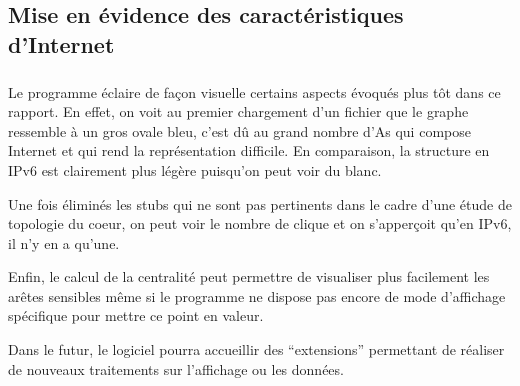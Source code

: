 \subsection{Mise en évidence des caractéristiques d'Internet}
\subparagraph{}
Le programme \'eclaire de fa\c con visuelle certains aspects \'evoqu\'es plus t\^ot dans ce rapport. En effet, on voit au premier chargement d'un fichier que le graphe ressemble \`a un gros ovale bleu, c'est d\^u au grand nombre d'As qui compose Internet et qui rend la repr\'esentation difficile. En comparaison, la structure en IPv6 est clairement plus l\'eg\`ere puisqu'on peut voir du blanc.
\par
Une fois \'elimin\'es les stubs qui ne sont pas pertinents dans le cadre d'une \'etude de topologie du coeur, on peut voir le nombre de clique et on s'apper\c coit qu'en IPv6, il n'y en a qu'une.
\par
Enfin, le calcul de la centralit\'e peut permettre de visualiser plus facilement les ar\^etes sensibles m\^eme si le programme ne dispose pas encore de mode d'affichage sp\'ecifique pour mettre ce point en valeur.
\par
Dans le futur, le logiciel pourra accueillir des ``extensions'' permettant de réaliser de nouveaux traitements sur l'affichage ou les données.